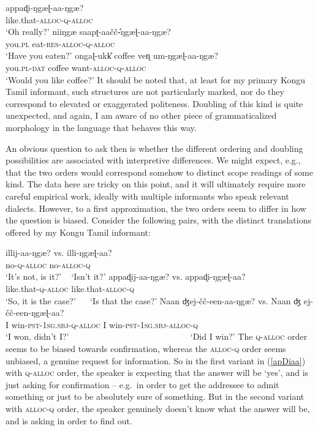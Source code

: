 \documentclass[output=paper, modfonts, nonflat]{langsci/langscibook}
\begin{document}
\ea\label{double}
 \ea\label{apdidouble}\gll appaɖi-ŋgæɭ-aa-ŋgæ?\\
 like.that-\textsc{alloc}-\textsc{q}-\textsc{alloc}\\
 \glt `Oh really?'
 \ex\label{saapdouble}\gll niiŋgæ{} saapʈ-aa\v{c}\v{c}\U-ŋgæɭ-aa-ŋgæ?\\
 you.\textsc{pl} eat-\textsc{res}-\textsc{alloc}-\textsc{q}-\textsc{alloc}\\
 \glt `Have you eaten?'
 \ex\label{coffeedouble}\gll ongaɭ-ukk\U{} coffee veɳ
 um-ŋgæɭ-aa-ŋgæ?\\
 you.\textsc{pl}-\textsc{dat}{} coffee want-\textsc{alloc}-\textsc{q}-\textsc{alloc}\\
 \glt `Would you like coffee?'
 \z
\z
%
It should be noted that, at least for my primary Kongu Tamil
informant, such structures are not particularly marked, nor do they
correspond to elevated or exaggerated politeness.  Doubling of this
kind is quite unexpected, and again, I am aware of no other piece of
grammaticalized morphology in the language that behaves this
way.

An obvious question to ask then is whether the different ordering and
doubling possibilities are associated with interpretive
differences. We might expect, e.g., that the two orders would
correspond somehow to distinct scope readings of some kind. The data
here are tricky on this point, and it will ultimately require more
careful empirical work, ideally with multiple informants who speak
relevant dialects. However, to a first approximation, the two orders
seem to differ in how the question is biased. Consider the following
pairs, with the distinct translations offered by my Kongu Tamil
informant:

\ea
 \ea\gll illij-aa-ŋgæ? {vs.} illi-ŋgæɭ-aa?\\
 no-\textsc{q}-\textsc{alloc}{} {} no-\textsc{alloc}-\textsc{q}\\
 \glt `It's not, is it?' ~ `Isn't it?'
 \ex\gll appaɖij-aa-ŋgæ? {vs.} appaɖi-ŋgæɭ-aa?\label{apDiaa}\\
 like.that-\textsc{q}-\textsc{alloc}{} {} like.that-\textsc{alloc}-\textsc{q}\\
 \glt `So, it is the case?' ~~ `Is that the case?'
 \ex\gll Naan ʤej-\v{c}\v{c}-een-aa-ŋgæ? {vs.} Naan ʤ
 ej-\v{c}\v{c}-een-ŋgæɭ-aa?\\
 I win-\textsc{pst}-1\textsc{sg}.\textsc{sbj}-\textsc{q}-\textsc{alloc}{} {} I win-\textsc{pst}-1\textsc{sg}.\textsc{sbj}-\textsc{alloc}-\textsc{q}\\
 \glt `I won, didn't I?' ~~~~~~~~~~~~~~~~~~~~~~~~~~~ `Did I win?'
 \z
\z
%
The \textsc{q}-\textsc{alloc}{} order seems to be biased towards confirmation,
whereas the \textsc{alloc}{}-\textsc{q} order seems unbiased, a genuine
request for information. So in the first variant in (\ref{apDiaa})
with \textsc{q}-\textsc{alloc}{} order, the speaker is expecting that the
answer will be `yes', and is just asking for confirmation -- e.g.\ in
order to get the addressee to admit something or just to be absolutely
sure of something. But in the second variant with \textsc{alloc}{}-\textsc{q}
order, the speaker genuinely doesn't know what the answer will be, and
is asking in order to find out. 
\end{document}
